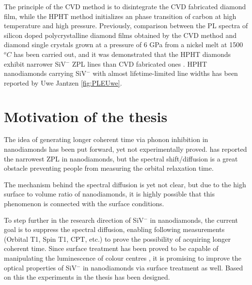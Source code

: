 The principle of the CVD method is to disintegrate the CVD fabricated diamond film, while the HPHT method initializes an phase transition of carbon at high temperature and high pressure. Previously, comparison between the PL spectra of silicon doped polycrystalline diamond films obtained by the CVD method and diamond single crystals grown at a pressure of 6 GPa from a nickel melt at 1500$^{o}C$ has been carried out, and it was demonstrated that the HPHT diamonds exhibit narrower SiV$^{-}$ ZPL lines than CVD fabricated ones \citep{clark_silicon_1995}. HPHT nanodiamonds carrying SiV$^{-}$ with almost lifetime-limited line widths has been reported by Uwe Jantzen \ref{fig:PLEUwe}. \citep{jantzen_nanodiamonds_2016}


\section[Motivation of the thesis]{Motivation of the thesis}

The idea of generating longer coherent time via phonon inhibition in nanodiamonds has been put forward, yet not experimentally proved.
\citep{jantzen_nanodiamonds_2016} has reported the narrowest ZPL in nanodiamonds, but the spectral shift/diffusion is a great obstacle preventing people from measuring the orbital relaxation time. 

The mechanism behind the spectral diffusion is yet not clear, but due to the high surface to volume ratio of nanodiamonds, it is highly possible that this phenomenon is connected with the surface conditions. \citep{jantzen_nanodiamonds_2016}

To step further in the research direction of SiV$^{-}$ in nanodiamonds, the current goal is to suppress the spectral diffusion, enabling following measurements (Orbital T1, Spin T1, CPT, etc.) to prove the possibility of acquiring longer coherent time. Since surface treatment has been proved to be capable of manipulating the luminescence of colour centres \citep{stacey_depletion_2012}, it is promising to improve the optical properties of SiV$^{-}$ in nanodiamonds via surface treatment as well. Based on this the experiments in the thesis has been designed.
